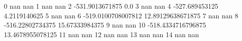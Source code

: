 0 nan nan
1 nan nan
2 -531.9013671875 0.0
3 nan nan
4 -527.689453125 4.2119140625
5 nan nan
6 -519.0100708007812 12.89129638671875
7 nan nan
8 -516.22802734375 15.67333984375
9 nan nan
10 -518.4334716796875 13.4678955078125
11 nan nan
12 nan nan
13 nan nan
14 nan nan
